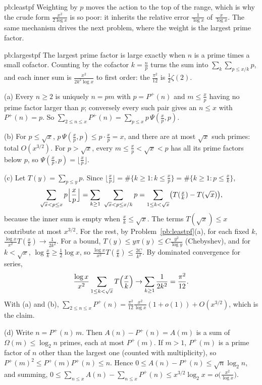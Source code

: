 \begin{solution}{pb:leastpf}
\leads Weighting by $p$ moves the action to the top of the range, which is why the crude form $\frac{x^2}{2\log x}$ is so poor: it inherits the relative error $\frac1{\log x}$
of $\frac x{\log x}$. The same mechanism drives the next problem, where the weight is the largest prime factor.
\end{solution}

\begin{solution}{pb:largestpf}
\idea The largest prime factor is large exactly when $n$ is a prime times a small cofactor. Counting by the cofactor $k=\frac np$ turns the sum into $\sum_k\sum_{p\le x/k}p$,
and each inner sum is $\frac{x^2}{2k^2\log x}$ to first order: the $\frac{\pi^2}{12}$ is $\frac12\zeta(2)$.

\writeup (a) Every $n\ge2$ is uniquely $n=pm$ with $p=P^+(n)$ and $m\le\frac xp$ having no prime factor larger than $p$; conversely every such pair gives an $n\le x$ with $P^+(n)=p$.
So $\sum_{2\le n\le x}P^+(n)=\sum_{p\le x}p\,\Psi(\frac xp,p)$.

(b) For $p\le\sqrt x$, $p\,\Psi(\frac xp,p)\le p\cdot\frac xp=x$, and there are at most $\sqrt x$ such primes: total $O(x^{3/2})$. For $p>\sqrt x$, every $m\le\frac xp<\sqrt x<p$
has all its prime factors below $p$, so $\Psi(\frac xp,p)=\lfloor\frac xp\rfloor$.

(c) Let $T(y)=\sum_{p\le y}p$. Since $\lfloor\frac xp\rfloor=\#\{k\ge1:k\le\frac xp\}=\#\{k\ge1:p\le\frac xk\}$,
\[
\sum_{\sqrt x<p\le x}p\Bigl\lfloor\frac xp\Bigr\rfloor=\sum_{k\ge1}\ \sum_{\sqrt x<p\le x/k}p=\sum_{1\le k<\sqrt x}\bigl(T(\tfrac xk)-T(\sqrt x)\bigr),
\]
because the inner sum is empty when $\frac xk\le\sqrt x$. The terms $T(\sqrt x)\le x$ contribute at most $x^{3/2}$. For the rest, by Problem~\ref{pb:leastpf}(a), for each fixed $k$,
$\frac{\log x}{x^2}T(\frac xk)\to\frac1{2k^2}$. For a bound, $T(y)\le y\pi(y)\le C\frac{y^2}{\log y}$ (Chebyshev), and for $k<\sqrt x$, $\log\frac xk\ge\frac12\log x$, so
$\frac{\log x}{x^2}T(\frac xk)\le\frac{2C}{k^2}$. By dominated convergence for series,
\[
\frac{\log x}{x^2}\sum_{1\le k<\sqrt x}T\Bigl(\frac xk\Bigr)\to\sum_{k\ge1}\frac1{2k^2}=\frac{\pi^2}{12}.
\]
With (a) and (b), $\sum_{2\le n\le x}P^+(n)=\frac{\pi^2}{12}\frac{x^2}{\log x}(1+o(1))+O(x^{3/2})$, which is the claim.

(d) Write $n=P^+(n)\,m$. Then $A(n)-P^+(n)=A(m)$ is a sum of $\Omega(m)\le\log_2n$ primes, each at most $P^+(m)$. If $m>1$, $P^+(m)$ is a prime factor of $n$ other than the
largest one (counted with multiplicity), so $P^+(m)^2\le P^+(m)P^+(n)\le n$. Hence $0\le A(n)-P^+(n)\le\sqrt n\log_2n$, and summing,
$0\le\sum_{n\le x}A(n)-\sum_{n\le x}P^+(n)\le x^{3/2}\log_2x=o\bigl(\frac{x^2}{\log x}\bigr)$.


\end{solution}
